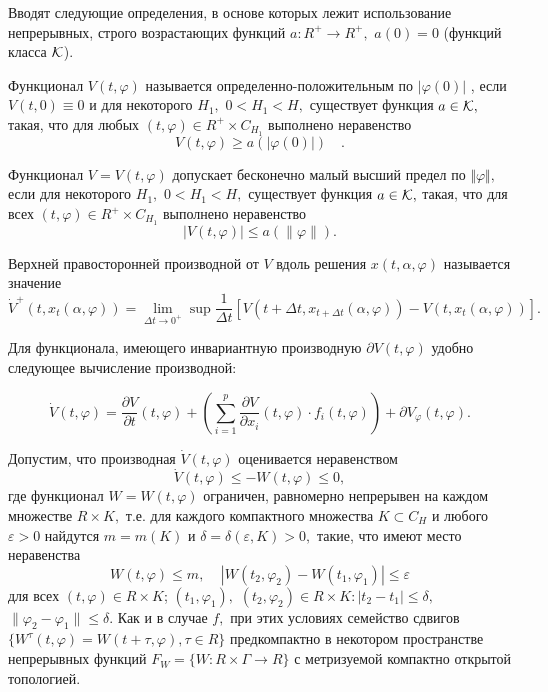 	Вводят следующие
	определения, в основе которых лежит использование непрерывных,
	строго возрастающих функций
	$a:R^+\to R^+,$ $a(0)=0$ (функций класса $\cal K$).
	
	\begin{definition}\label{def-1.1} Функционал $V(t,\varphi )$ называется
		оп\-ре\-де\-лен\-но-по\-ло\-жи\-тель\-ным по $|\varphi(0)|$ , если $V(t,0)\equiv 0$ и для некоторого $H_1,$
		$0<H_1<H,$ существует функция $a\in {\cal K},$ такая, что для
		любых $(t,\varphi) \in R^+\times C_{H_1}$ выполнено неравенство $$
		V(t,\varphi )\ge a(|\varphi (0)|)\quad. $$
	\end{definition}
	
	\begin{definition}\label{d2.10} Функционал $V=V(t,\varphi )$ допускает бесконечно
		малый высший предел по $\Vert \varphi \Vert,$ если для некоторого
		$H_1,$ $0<H_1<H,$ существует функция $a\in {\cal K},$ такая, что
		для всех  $(t,\varphi) \in R^+\times C_{H_1}$ выполнено
		неравенство $$ |V(t,\varphi )|\le a(\|\varphi\| ). $$
	\end{definition}
	
	Верхней правосторонней производной от $V$ вдоль решения $x(t,\alpha,\varphi )$
	называется значение \cite{kra591, hei84}
	\begin{equation}\label{der42}
	\dot V^+(t,x_t(\alpha,\varphi ))=\lim\limits_{\Delta t\to
		0^+}\sup\frac1{\Delta t}\left[ V(t+\Delta t,x_{t+\Delta t}(\alpha
	,\varphi ))-V(t,x_t(\alpha,\varphi ))\right].
	\end{equation}
	
	Для функционала, имеющего инвариантную производную $\partial V (t, \varphi)$ удобно следующее вычисление производной:
	
	\begin{equation}\label{1.3}
	\dot V(t,\varphi)=\frac{\partial V}{\partial t}(t,\varphi)+
	\left( \sum\limits_{i=1}^p\frac{\partial V}{\partial
		x_i}(t,\varphi )\cdot f_i(t,\varphi )\right) +\partial
	V_{\varphi}(t,\varphi ).
	\end{equation}

Допустим, что производная $\dot V(t,\varphi )$ оценивается неравенством
\begin{equation}
\dot V(t,\varphi )\le -W(t,\varphi )\le 0, \label{3.3'}
\end{equation}
где функционал $W=W(t,\varphi )$ ограничен, равномерно непрерывен
на каждом множестве $R \times K,$ т.е. для каждого компактного
множества $K\subset C_H$ и любого $\varepsilon >0$ найдутся
$m=m(K)$ и $\delta =\delta (\varepsilon ,K)>0,$ такие, что имеют
место неравенства
\begin{equation}
W(t,\varphi )\le m,\ \ \ \ \ |W(t_2,\varphi _2)-W(t_1,\varphi
_1)|\le\varepsilon \label{3.4'}
\end{equation}
для всех $(t,\varphi )\in R \times K$; $(t_1,\varphi _1),$
$(t_2,\varphi _2)\in R \times K : |t_2-t_1|\le \delta,$
$\|\varphi _2-\varphi _1\|\le\delta.$
Как и в случае $f,$ при этих  условиях семейство сдвигов $\{
W^{\tau }(t,\varphi )=W(t+\tau ,\varphi ), \tau\in R\}$
предкомпактно в некотором пространстве непрерывных функций
$F_{W}=\{ W : R\times\Gamma\to R\}$  с метризуемой компактно
открытой топологией.

